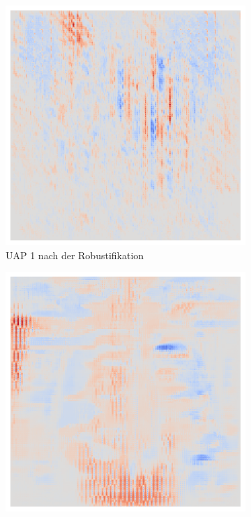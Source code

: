 \begin{figure}[ht!]
\begin{subfigure}{0.19\linewidth}
        \includegraphics[height=1\linewidth]{01-images/05-resultate/uap_efficientnet/uap0-efficientnetv2m-mri-n200-robustificationslevel5.png}
        \caption{UAP 1 nach der Robustifikation}
    \end{subfigure}
    \hfill%
    \begin{subfigure}{0.19\linewidth}
        \centering
        \includegraphics[height=1\linewidth]{01-images/05-resultate/uap_efficientnet/uap0-efficientnetv2m-covid-n200-robustificationslevel0.png}

\end{subfigure}
\end{figure}
